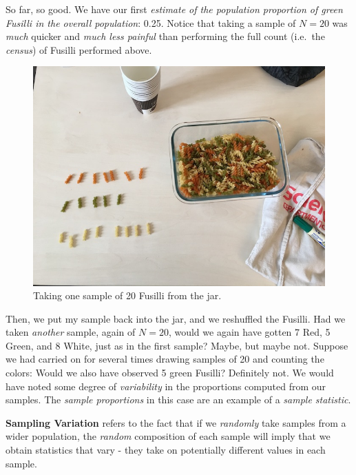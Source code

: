\documentclass[]{book}
\newenvironment{note}{\begin{tcolorbox}[colback=blue!5!white,colframe=blue!75!black]}{\end{tcolorbox}}
\begin{document}
So far, so good. We have our first \emph{estimate of the population
proportion of green Fusilli in the overall population}: 0.25. Notice
that taking a sample of \(N=20\) was \emph{much} quicker and \emph{much
less painful} than performing the full count (i.e.~the \emph{census}) of
Fusilli performed above.

\begin{figure}

{\centering \includegraphics[width=0.9\linewidth]{images/pasta5} 

}

\caption{Taking one sample of 20 Fusilli from the jar.}\label{fig:pasta5}
\end{figure}

Then, we put my sample back into the jar, and we reshuffled the Fusilli.
Had we taken \emph{another} sample, again of \(N=20\), would we again
have gotten 7 Red, 5 Green, and 8 White, just as in the first sample?
Maybe, but maybe not. Suppose we had carried on for several times
drawing samples of 20 and counting the colors: Would we also have
observed 5 green Fusilli? Definitely not. We would have noted some
degree of \emph{variability} in the proportions computed from our
samples. The \emph{sample proportions} in this case are an example of a
\emph{sample statistic}.

\begin{note}
\textbf{Sampling Variation} refers to the fact that if we
\emph{randomly} take samples from a wider population, the \emph{random}
composition of each sample will imply that we obtain statistics that
vary - they take on potentially different values in each sample.
\end{note}
\end{document}
